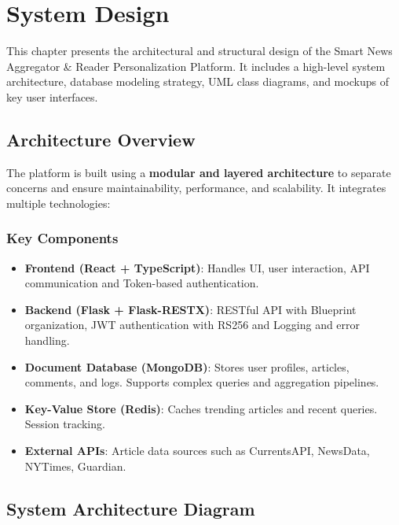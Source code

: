

\chapter{System Design}\label{ch:system-design}


This chapter presents the architectural and structural design of the Smart News Aggregator \& Reader Personalization Platform.
It includes a high-level system architecture, database modeling strategy, UML class diagrams, and mockups of key user interfaces.


\section{Architecture Overview}\label{sec:architecture-overview}

The platform is built using a \textbf{modular and layered architecture} to separate concerns and ensure maintainability, performance, and scalability.
It integrates multiple technologies:

\subsection{Key Components}\label{subsec:key-components}

\begin{itemize}
    \item \textbf{Frontend (React + TypeScript)}: Handles UI, user interaction, API communication and Token-based authentication.
    \item \textbf{Backend (Flask + Flask-RESTX)}: RESTful API with Blueprint organization, JWT authentication with RS256 and Logging and error handling.
    \item \textbf{Document Database (MongoDB)}: Stores user profiles, articles, comments, and logs.
    Supports complex queries and aggregation pipelines.
    \item \textbf{Key-Value Store (Redis)}: Caches trending articles and recent queries.
    Session tracking.
    \item \textbf{External APIs}: Article data sources such as CurrentsAPI, NewsData, NYTimes, Guardian.
\end{itemize}


\section{System Architecture Diagram}\label{sec:system-architecture-diagram}

